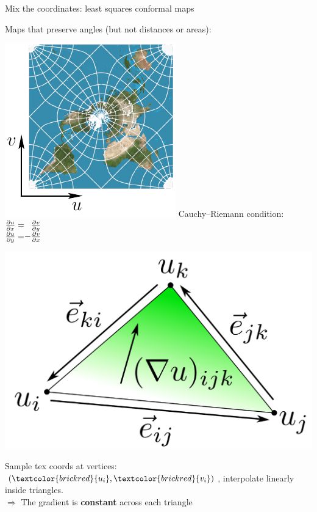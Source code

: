 \documentclass[UKenglish,aspectratio=169]{beamer}
\newcommand\unknown[1]{\textcolor{brickred}{#1}}
\begin{document}
\begin{frame}{Mix the coordinates: least squares conformal maps}
\begin{minipage}{.32\linewidth}
\centering
Maps that preserve angles (but not distances or areas):

\includegraphics[width=.8\linewidth]{../manuscript/img/conformal.pdf}
\pause
Cauchy--Riemann condition:\\
$
\arraycolsep=0pt
 \begin{array}{rcl}
\frac{\partial u}{\partial x} =&  &\frac{\partial v}{\partial y} \\
\frac{\partial u}{\partial y} =& -&\frac{\partial v}{\partial x}
\end{array}
$
\end{minipage}
\pause
\quad
\begin{minipage}{.6\linewidth}
\begin{minipage}{.4\linewidth}
\includegraphics[width=\linewidth]{../manuscript/img/gradient-bg.png}
\end{minipage}
\begin{minipage}{.58\linewidth}
Sample tex coords at vertices: $(\unknown{u_i}, \unknown{v_i})$,
interpolate linearly inside triangles.\\
$\Rightarrow$
The gradient is \textbf{constant} across each triangle
\end{minipage}


\end{minipage}
\end{frame}
\end{document}
